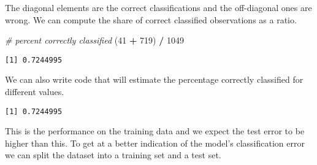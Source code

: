 \documentclass[]{article}
\newenvironment{Shaded}{\begin{snugshade}}{\end{snugshade}}
\newcommand{\CommentTok}[1]{\textcolor[rgb]{0.56,0.35,0.01}{\textit{#1}}}
\newcommand{\DataTypeTok}[1]{\textcolor[rgb]{0.13,0.29,0.53}{#1}}
\newcommand{\DecValTok}[1]{\textcolor[rgb]{0.00,0.00,0.81}{#1}}
\newcommand{\KeywordTok}[1]{\textcolor[rgb]{0.13,0.29,0.53}{\textbf{#1}}}
\newcommand{\NormalTok}[1]{#1}
\newcommand{\OperatorTok}[1]{\textcolor[rgb]{0.81,0.36,0.00}{\textbf{#1}}}
\newcommand{\OtherTok}[1]{\textcolor[rgb]{0.56,0.35,0.01}{#1}}
\newcommand{\StringTok}[1]{\textcolor[rgb]{0.31,0.60,0.02}{#1}}
\begin{document}
The diagonal elements are the correct classifications and the off-diagonal ones are wrong. We can compute the share of correct classified observations as a ratio.

\begin{Shaded}
\begin{Highlighting}[]
\CommentTok{# percent correctly classified}
\NormalTok{(}\DecValTok{41} \OperatorTok{+}\StringTok{ }\DecValTok{719}\NormalTok{) }\OperatorTok{/}\StringTok{ }\DecValTok{1049}
\end{Highlighting}
\end{Shaded}

\begin{verbatim}
[1] 0.7244995
\end{verbatim}

We can also write code that will estimate the percentage correctly classified for different values.

\begin{Shaded}
\end{Shaded}

\begin{verbatim}
[1] 0.7244995
\end{verbatim}

This is the performance on the training data and we expect the test error to be higher than this. To get at a better indication of the model's classification error we can split the dataset into a training set and a test set.

\begin{Shaded}
\end{Shaded}
\end{document}
